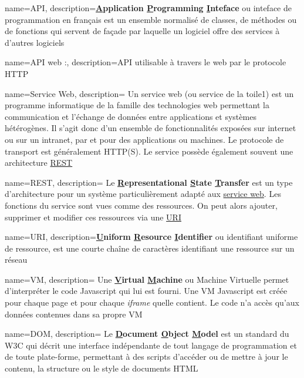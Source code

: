 {
    name=API,
    description={\textbf{\underline{A}pplication \underline{P}rogramming \underline{I}nteface} ou inteface de programmation en français est un ensemble normalisé de classes, de méthodes ou de fonctions qui servent de façade par laquelle un logiciel offre des services à d'autres logiciels}
}

{
    name=API web :,
    description={\gls{API} utilisable à travers le web par le protocole HTTP}
}

{
    name=Service Web,
    description=
    {
        Un service web (ou service de la toile1) est un programme informatique de la famille des technologies web permettant la communication et l'échange de données entre applications et systèmes hétérogènes.
        Il s'agit donc d'un ensemble de fonctionnalités exposées sur internet ou sur un intranet, par et pour des applications ou machines.
        Le protocole de transport est généralement HTTP(S). Le service possède également souvent une architecture \underline{\gls{REST}}
    }
}

{
    name=REST,
    description=
    {
        Le \textbf{\underline{R}epresentational \underline{S}tate \underline{T}ransfer} est un type d'architecture pour un système particulièrement adapté aux \underline{\gls{service web}}. Les fonctions du service sont vues comme des ressources. On peut alors ajouter, supprimer et modifier ces ressources via une \underline{\gls{URI}}
    }
}

{
    name=URI,
    description={\textbf{\underline{U}niform \underline{R}esource \underline{I}dentifier} ou identifiant uniforme de ressource, est une courte chaîne de caractères identifiant une ressource sur un réseau}
}

{
    name=VM,
    description=
    {
        Une \textbf{\underline{V}irtual \underline{M}achine} ou Machine Virtuelle permet d'interpréter le code Javascript qui lui est fourni. Une VM Javascript est créée pour chaque page et pour chaque \textit{iframe} quelle contient. Le code n'a accès qu'aux données contenues dans sa propre VM
    }
}

{
    name=DOM,
    description=
    {
        Le \textbf{\underline{D}ocument \underline{O}bject \underline{M}odel} est un standard du W3C qui décrit une interface indépendante de tout langage de programmation et de toute plate-forme, permettant à des scripts d'accéder ou de mettre à jour le contenu, la structure ou le style de documents HTML
    }
}

